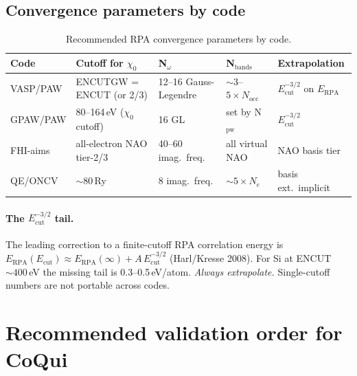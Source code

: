 \documentclass[11pt]{article}
\begin{document}
\subsection{Convergence parameters by code}

\begin{table}[h]
\centering
\caption{Recommended RPA convergence parameters by code.}
\label{tab:rpa_conv}
\small
\begin{tabular}{l p{2.4cm} p{2.4cm} p{2.6cm} p{4cm}}
\toprule
Code & Cutoff for $\chi_0$ & N$_\omega$ & N$_\mathrm{bands}$ & Extrapolation \\
\midrule
VASP/PAW   & ENCUTGW = ENCUT (or 2/3) & 12--16 Gauss-Legendre & $\sim 3$--$5\times N_{\mathrm{occ}}$ & $E_{\mathrm{cut}}^{-3/2}$ on $E_{\mathrm{RPA}}$ \\
GPAW/PAW   & 80--164\,eV ($\chi_0$ cutoff) & 16 GL & set by N$_{\mathrm{pw}}$ & $E_{\mathrm{cut}}^{-3/2}$ \\
FHI-aims   & all-electron NAO tier-2/3 & 40--60 imag.\ freq. & all virtual NAO & NAO basis tier \\
QE/ONCV    & $\sim 80\,$Ry        & 8 imag.\ freq. & $\sim 5\times N_e$ & basis ext.\ implicit \\
\bottomrule
\end{tabular}
\end{table}

\paragraph{The $E_{\mathrm{cut}}^{-3/2}$ tail.}
The leading correction to a finite-cutoff RPA correlation energy is
$E_{\mathrm{RPA}}(E_{\mathrm{cut}}) \approx E_{\mathrm{RPA}}(\infty)
+ A\, E_{\mathrm{cut}}^{-3/2}$ (Harl/Kresse 2008). For Si at
ENCUT $\sim 400$\,eV the missing tail is 0.3--0.5\,eV/atom. \emph{Always
extrapolate.} Single-cutoff numbers are not portable across codes.

\newpage
\section{Recommended validation order for CoQui}
\end{document}
